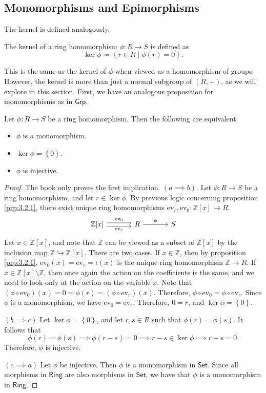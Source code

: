 \subsection{Monomorphisms and Epimorphisms}
The kernel is defined analogously.
\begin{definition}[Kernel]\label{dfn:3.2.2}
	The kernel of a ring homomorphism $\phi : R \to S$ is defined as
	\[
		\ker \phi \coloneqq \left\{ r\in R \mid \phi (r)=0 \right\} 
	.\]
\end{definition}
This is the same as the kernel of $\phi $ when viewed as a homomorphism of groups. However, the kernel is more than just a normal subgroup of $(R,+)$, as we will explore in this section. First, we have an analogous proposition for monomorphisms as in $\mathsf{Grp}$.
\begin{proposition}\label{prp:3.2.2}
	Let $\phi : R \to S$ be a ring homomorphism. Then the following are equivalent.
	\begin{itemize}
		\item  $\phi $ is a monomorphism.
		\item $\ker \phi =\left\{ 0 \right\} $.
		\item  $\phi $ is injective.
	\end{itemize}
\end{proposition}
\begin{proof}
	The book only proves the first implication. $(a\implies b)$. Let $\phi : R \to S$ be a ring homomorphism, and let $r\in \ker \phi $. By previous logic concerning proposition \ref{prp:3.2.1}, there exist unique ring homomorphisms $\mathrm{ev} _r,\mathrm{ev} _0 : \mathbb{Z}[x] \to R$.
	\[\begin{tikzcd}[row sep=2.5em, column sep=3.5em]
		\mathbb{Z}[x]\arrow[r, shift left, "\mathrm{ev}_0"]\arrow[r, shift right, "\mathrm{ev}_r"']&R\arrow[r, "\phi "]&S
	\end{tikzcd}\]
	Let $x\in \mathbb{Z}[x]$, and note that $\mathbb{Z}$ can be viewed as a subset of $\mathbb{Z}[x]$ by the inclusion map $\mathbb{Z}\hookrightarrow \mathbb{Z}[x]$. There are two cases. If $x\in\mathbb{Z}$, then by proposition \ref{prp:3.2.1}, $\mathrm{ev}_0(x)=\mathrm{ev}_r = \iota(x)$ is the unique ring homomorphism $\mathbb{Z}\to R$. If $x\in \mathbb{Z}[x]\setminus\mathbb{Z}$, then once again the action on the coefficients is the same, and we need to look only at the action on the variable $x$. Note that $(\phi \circ \mathrm{ev}_0)(x) = 0 = \phi (r)=\left( \phi \circ \mathrm{ev}_r \right) (x)$. Therefore, $\phi \circ \mathrm{ev}_0=\phi \circ \mathrm{ev}_r$. Since $\phi $ is a monomorphism, we have $\mathrm{ev}_0=\mathrm{ev}_r$. Therefore, $0=r$, and $\ker \phi = \left\{ 0 \right\} $.

	$(b\implies c)$ Let $\ker \phi =\left\{ 0 \right\} $, and let $r,s\in R$ such that $\phi (r)=\phi (s)$. It follows that
	\[
		\phi (r)=\phi (s)\implies \phi (r-s)=0 \implies r-s\in \ker \phi \implies r-s=0
	.\]
	Therefore, $\phi $ is injective.

	$(c\implies a)$ Let $\phi $ be injective. Then $\phi $ is a monomorphism in $\mathsf{Set}$. Since all morphisms in $\mathsf{Ring}$ are also morphisms in $\mathsf{Set}$, we  have that $\phi $ is a monomorphism in $\mathsf{Ring}$.
\end{proof}
